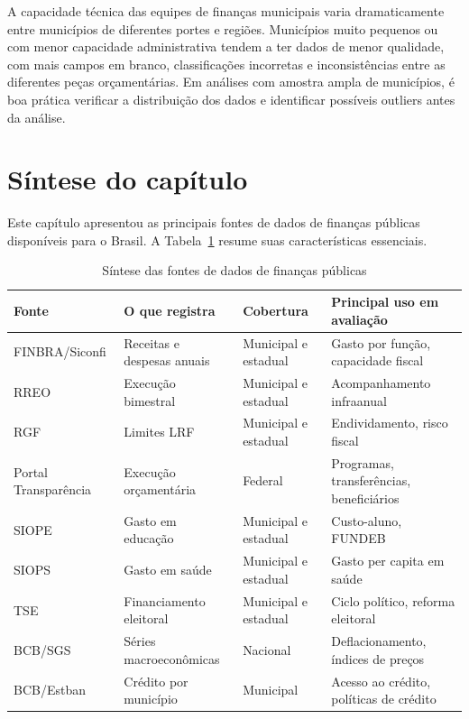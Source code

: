 A capacidade técnica das equipes de finanças municipais varia dramaticamente entre municípios de diferentes portes e regiões. Municípios muito pequenos ou com menor capacidade administrativa tendem a ter dados de menor qualidade, com mais campos em branco, classificações incorretas e inconsistências entre as diferentes peças orçamentárias. Em análises com amostra ampla de municípios, é boa prática verificar a distribuição dos dados e identificar possíveis outliers antes da análise.

\section{Síntese do capítulo}

Este capítulo apresentou as principais fontes de dados de finanças públicas disponíveis para o Brasil. A Tabela~\ref{tab:sintese_cap10} resume suas características essenciais.

\begin{table}[H]
\centering
\caption{Síntese das fontes de dados de finanças públicas}
\label{tab:sintese_cap10}
\small
\begin{tabularx}{\textwidth}{@{} >{\raggedright\arraybackslash}p{2.8cm} >{\raggedright\arraybackslash}p{3cm} >{\raggedright\arraybackslash}p{2.6cm} X @{}}
\toprule
\textbf{Fonte} & \textbf{O que registra} & \textbf{Cobertura} &
\textbf{Principal uso em avaliação} \\
\midrule
FINBRA/Siconfi   & Receitas e despesas anuais    & Municipal e estadual & Gasto por função, capacidade fiscal \\
RREO             & Execução bimestral            & Municipal e estadual & Acompanhamento infraanual \\
RGF              & Limites LRF                   & Municipal e estadual & Endividamento, risco fiscal \\
Portal Transparência & Execução orçamentária     & Federal            & Programas, transferências, beneficiários \\
SIOPE            & Gasto em educação             & Municipal e estadual & Custo-aluno, FUNDEB \\
SIOPS            & Gasto em saúde                & Municipal e estadual & Gasto per capita em saúde \\
TSE              & Financiamento eleitoral       & Municipal e estadual & Ciclo político, reforma eleitoral \\
BCB/SGS          & Séries macroeconômicas        & Nacional           & Deflacionamento, índices de preços \\
BCB/Estban       & Crédito por município         & Municipal          & Acesso ao crédito, políticas de crédito \\
\bottomrule
\end{tabularx}
\end{table}

